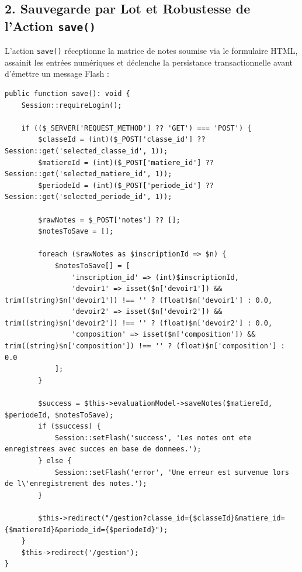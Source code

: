 \documentclass[11pt,a4paper,oneside]{report}
\begin{document}
\subsection{2. Sauvegarde par Lot et Robustesse de l'Action \texttt{save()}}
L'action \texttt{save()} réceptionne la matrice de notes soumise via le formulaire HTML, assainit les entrées numériques et déclenche la persistance transactionnelle avant d'émettre un message Flash :

\begin{lstlisting}[language=PHP8, caption={Traitement de sauvegarde groupée et redirection PRG}]
public function save(): void {
    Session::requireLogin();

    if (($_SERVER['REQUEST_METHOD'] ?? 'GET') === 'POST') {
        $classeId = (int)($_POST['classe_id'] ?? Session::get('selected_classe_id', 1));
        $matiereId = (int)($_POST['matiere_id'] ?? Session::get('selected_matiere_id', 1));
        $periodeId = (int)($_POST['periode_id'] ?? Session::get('selected_periode_id', 1));

        $rawNotes = $_POST['notes'] ?? [];
        $notesToSave = [];

        foreach ($rawNotes as $inscriptionId => $n) {
            $notesToSave[] = [
                'inscription_id' => (int)$inscriptionId,
                'devoir1' => isset($n['devoir1']) && trim((string)$n['devoir1']) !== '' ? (float)$n['devoir1'] : 0.0,
                'devoir2' => isset($n['devoir2']) && trim((string)$n['devoir2']) !== '' ? (float)$n['devoir2'] : 0.0,
                'composition' => isset($n['composition']) && trim((string)$n['composition']) !== '' ? (float)$n['composition'] : 0.0
            ];
        }

        $success = $this->evaluationModel->saveNotes($matiereId, $periodeId, $notesToSave);
        if ($success) {
            Session::setFlash('success', 'Les notes ont ete enregistrees avec succes en base de donnees.');
        } else {
            Session::setFlash('error', 'Une erreur est survenue lors de l\'enregistrement des notes.');
        }

        $this->redirect("/gestion?classe_id={$classeId}&matiere_id={$matiereId}&periode_id={$periodeId}");
    }
    $this->redirect('/gestion');
}
\end{lstlisting}

\end{document}
